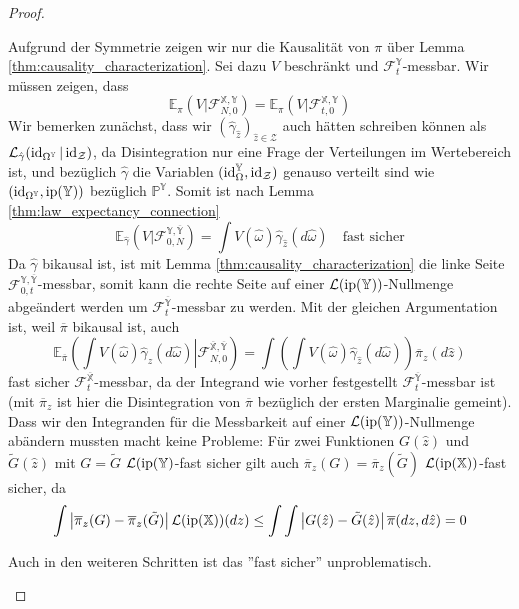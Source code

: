 \begin{proof}
\begin{enumerate}
Aufgrund der Symmetrie zeigen wir nur die Kausalität von $\pi$ über Lemma \ref{thm:causality_characterization}. Sei dazu $V$ beschränkt und $\mathcal{F}_{t}^{\mathbb{Y}}$-messbar. Wir müssen zeigen, dass 
$$\mathbb{E}_\pi(V \vert \mathcal{F}_{N, 0}^{\mathbb{X}, \mathbb{Y}}) = \mathbb{E}_\pi(V \vert \mathcal{F}_{t, 0}^{\mathbb{X}, \mathbb{Y}})$$
Wir bemerken zunächst, dass wir $(\hat{\gamma}_{\hat{z}})_{\hat{z}\in\mathcal{Z}}$ auch hätten schreiben können als $\mathcal{L}_{\hat{\gamma}}(\operatorname{id}_{\Omega^\mathbb{Y}} \vert \operatorname{id}_{\mathcal{Z}})$, da Disintegration nur eine Frage der Verteilungen im Wertebereich ist, und bezüglich $\hat{\gamma}$ die Variablen $(\operatorname{id}_\Omega^\mathbb{Y}, \operatorname{id}_{\mathcal{Z}})$ genauso verteilt sind wie $(\operatorname{id}_{\Omega^\mathbb{Y}}, \operatorname{ip}(\mathbb{Y}))$ bezüglich $\mathbb{P}^\mathbb{Y}$. Somit ist nach Lemma \ref{thm:law_expectancy_connection}
$$\mathbb{E}_{\hat{\gamma}}(V \vert \mathcal{F}_{0,N}^{\mathbb{Y}, \overline{\mathbb{Y}}}) = \int V(\hat{\omega})\hat{\gamma}_{\hat{z}}(d\hat{\omega}) \quad \text{fast sicher}$$
Da $\hat{\gamma}$ bikausal ist, ist mit Lemma \ref{thm:causality_characterization} die linke Seite $\mathcal{F}_{0,t}^{\mathbb{Y}, \overline{\mathbb{Y}}}$-messbar, somit kann die rechte Seite auf einer $\mathcal{L}(\operatorname{ip}(\mathbb{Y}))$-Nullmenge abgeändert werden um $\mathcal{F}_t^{\overline{\mathbb{Y}}}$-messbar zu werden. Mit der gleichen Argumentation ist, weil $\overline{\pi}$ bikausal ist, auch
$$\mathbb{E}_{\overline{\pi}}\left(\int V(\hat{\omega})\hat{\gamma}_{\hat{z}}(d\hat{\omega}) \left\vert \mathcal{F}_{N,0}^{\overline{\mathbb{X}}, \overline{\mathbb{Y}}}\right.\right)=\int\left(\int V(\hat{\omega})\hat{\gamma}_{\hat{z}}(d\hat{\omega})\right)\overline{\pi}_z(d\hat{z})$$
fast sicher $\mathcal{F}_t^{\overline{\mathbb{X}}}$-messbar, da der Integrand wie vorher festgestellt $\mathcal{F}_t^{\overline{\mathbb{Y}}}$-messbar ist (mit $\overline{\pi}_z$ ist hier die Disintegration von $\overline{\pi}$ bezüglich der ersten Marginalie gemeint). Dass wir den Integranden für die Messbarkeit auf einer $\mathcal{L}(\operatorname{ip}(\mathbb{Y}))$-Nullmenge abändern mussten macht keine Probleme: Für zwei Funktionen $G(\hat{z})$ und $\tilde{G}(\hat{z})$ mit $G=\tilde{G}$ $\mathcal{L}(\operatorname{ip}(\mathbb{Y})$-fast sicher gilt auch $\overline{\pi}_z(G) = \overline{\pi}_z(\tilde{G})$ $\mathcal{L}(\operatorname{ip}(\mathbb{X}))$-fast sicher, da
$$\int \left|\overline{\pi}_z(G) - \overline{\pi}_z(\tilde{G})\right| \mathcal{L}(\operatorname{ip}(\mathbb{X}))(dz) \leq \int \int \left|G(\hat{z}) - \tilde{G}(\hat{z})\right| \overline{\pi}(dz, d\hat{z}) = 0$$

Auch in den weiteren Schritten ist das ''fast sicher'' unproblematisch.


\end{enumerate}
\end{proof}
